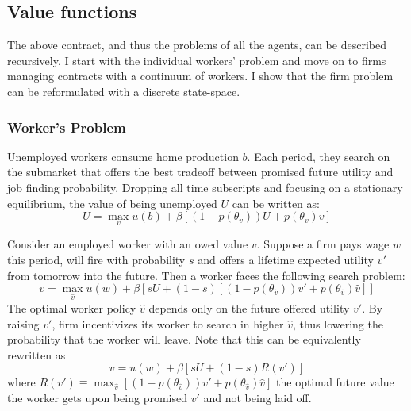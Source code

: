 \subsection{Value functions}
The above contract, and thus the problems of all the agents, can be described recursively. I start with the individual workers' problem and move on to firms managing contracts with a continuum of workers. I show that the firm problem can be reformulated with a discrete state-space.
\subsubsection*{Worker's Problem} %
Unemployed workers consume home production $b$. Each period, they search on the submarket that offers the best tradeoff between promised future utility and job finding probability. Dropping all time subscripts and focusing on a stationary equilibrium, the value of being unemployed $U$ can be written as:
\begin{equation} \label{unempproblem}
    U =\max_{v} u(b) + \beta[(1 - p(\theta_v))U + p(\theta_v)v]
\end{equation}

Consider an employed worker with an owed value $v$. Suppose a firm pays wage $w$ this period, will fire with probability $s$ and offers a lifetime expected utility $v'$ from tomorrow into the future. Then a worker faces the following search problem:
\begin{equation} \label{empproblem}
  v=\max_{\hat{v}} u(w) + \beta[sU + (1-s)[(1-p(\theta_{\hat{v}}))v'+p(\theta_{\hat{v}})\hat{v}]]   
\end{equation}
The optimal worker policy $\hat{v}$ depends only on the future offered utility $v'$. By raising $v'$, firm incentivizes its worker to search in higher $\hat{v}$, thus lowering the probability that the worker will leave.
Note that this can be equivalently rewritten as 
\begin{equation*}
  v=u(w) + \beta[sU + (1-s)R(v')]  
\end{equation*}
where $R(v') \equiv \max_{\hat{v}}[(1-p(\theta_{\hat{v}}))v'+p(\theta_{\hat{v}})\hat{v}]$ the optimal future value the worker gets upon being promised $v'$ and not being laid off.
